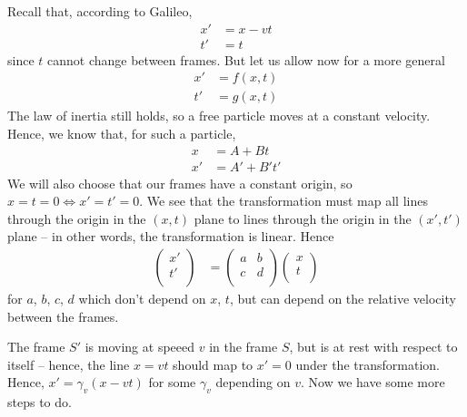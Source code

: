 \documentclass{../../template/note}
\begin{document}
    Recall that, according to Galileo,
    \begin{align*}
        x' &= x-vt \\
        t' &= t
    \end{align*}
    since \(t\) cannot change between frames. But let us allow now for a more general
    \begin{align*}
        x' &= f(x, t) \\
        t' &= g(x, t)
    \end{align*}
    The law of inertia still holds, so a free particle moves at a constant velocity. Hence, we know that, for such a particle,  
    \begin{align*}
        x &= A + Bt \\
        x' &= A' + B't'
    \end{align*}
    We will also choose that our frames have a constant origin, so \(x = t = 0 \iff x' = t' = 0\). We see that the transformation must map all lines through the origin in the \((x, t)\) plane to lines through the origin in the \((x', t')\) plane -- in other words, the transformation is linear. Hence
    \begin{align*}
        \begin{pmatrix}
         x' \\
         t' \\
        \end{pmatrix} &= \begin{pmatrix}
         a & b \\
         c & d \\
        \end{pmatrix} \begin{pmatrix}
         x \\
         t \\
        \end{pmatrix}
    \end{align*}
    for \(a\), \(b\), \(c\), \(d\) which don't depend on \(x\), \(t\), but can depend on the relative velocity between the frames.
    
    
    The frame \(S'\) is moving at speeed \(v\) in the frame \(S\), but is at rest with respect to itself -- hence, the line \(x=vt\) should map to \(x'=0\) under the transformation. Hence, \(x' = \gamma_v(x-vt)\) for some \(\gamma_v\) depending on \(v\). Now we have some more steps to do.
\end{document}
